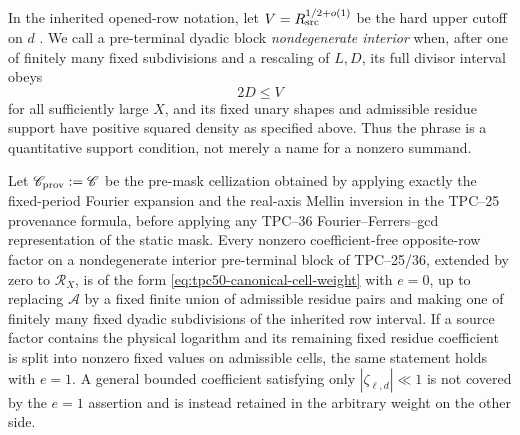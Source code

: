 In the inherited opened-row notation, let
\(V=R_{\rm src}^{1/2+o(1)}\) be the hard upper cutoff on \(d\)
\citep{WangTPC25}.  We call a pre-terminal dyadic block
\emph{nondegenerate interior} when, after one of finitely many fixed
subdivisions and a rescaling of \(L,D\), its full divisor interval obeys
\begin{equation}
 2D\leq V
 \label{eq:tpc50-interior-cutoff-condition}
\end{equation}
for all sufficiently large \(X\), and its fixed unary shapes and
admissible residue support have positive squared density as specified
above.  Thus the phrase is a quantitative support condition, not merely
a name for a nonzero summand.

\begin{proposition}
\label{prop:tpc50-direct-provenance-identification}
Let \(\mathscr C_{\rm prov}:=\mathscr C\) be the pre-mask cellization obtained by
applying exactly the fixed-period Fourier expansion and the real-axis
Mellin inversion in the TPC--25 provenance formula, before applying any
TPC--36 Fourier--Ferrers--gcd representation of the static mask.
Every nonzero coefficient-free opposite-row factor on a nondegenerate
interior pre-terminal block of TPC--25/36, extended by zero to
\(\mathcal R_X\), is of the form
\eqref{eq:tpc50-canonical-cell-weight} with \(e=0\), up to replacing
\(\mathcal A\) by a fixed finite union of admissible residue pairs and
making one of finitely many fixed dyadic subdivisions of the inherited
row interval.
If a source factor contains the physical logarithm and its remaining
fixed residue coefficient is split into nonzero fixed values on
admissible cells, the same statement holds with \(e=1\).  A general
bounded coefficient satisfying only \(|\zeta_{\ell,d}|\ll1\) is not
covered by the \(e=1\) assertion and is instead retained in the
arbitrary weight on the other side.
\end{proposition}

